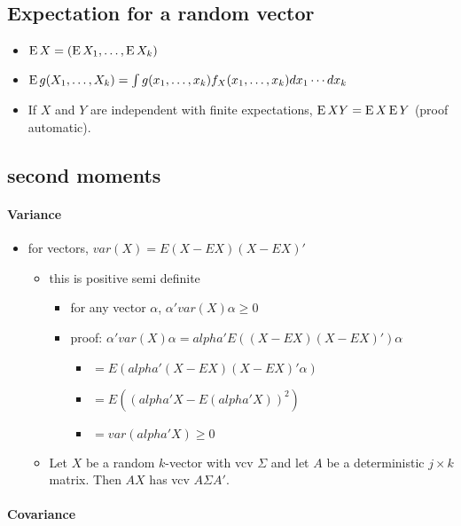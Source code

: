 \subsection{Expectation for a random vector}
\label{sec-3-1}

\begin{itemize}
\item $\operatorname{E} X = (\operatorname{E} X_1,\dots,\operatorname{E} X_k)$
\item $\operatorname{E} g(X_1,\dots,X_k) = \int g(x_1,\dots,x_k) f_X(x_1,\dots,x_k)
       dx_1 \cdots dx_k$
\item If $X$ and $Y$ are independent with finite expectations, $\operatorname{E} XY
       = \operatorname{E} X \operatorname{E} Y$ (proof automatic).
\end{itemize}
\subsection{second moments}
\label{sec-3-2}
\paragraph{Variance}
\label{sec-3-2-1}

\begin{itemize}
\item for vectors, $var(X) = E(X - EX) (X - EX)'$
\begin{itemize}
\item this is positive semi definite
\begin{itemize}
\item for any vector $\alpha$, $\alpha'var(X)\alpha \geq 0$
\item proof: $\alpha' var(X) \alpha = alpha' E((X - EX)(X - EX)') \alpha$
\begin{itemize}
\item $= E( alpha'(X - EX)(X - EX)' \alpha)$
\item $= E( (alpha'X - E(alpha'X))^2)$
\item $= var(alpha'X) \geq 0$
\end{itemize}
\end{itemize}
\item Let $X$ be a random $k$-vector with vcv $\Sigma$ and let
         $A$ be a deterministic $j \times k$ matrix.  Then $A X$
         has vcv $A \Sigma A'$.
\end{itemize}
\end{itemize}
\paragraph{Covariance}
\label{sec-3-2-2}

